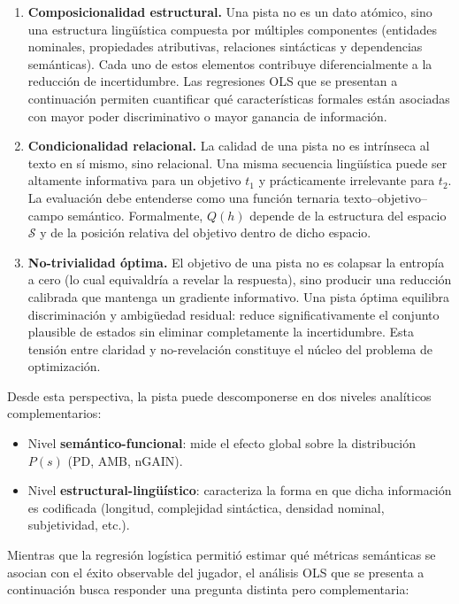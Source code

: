 \documentclass[../main.tex]{subfiles}
\begin{document}
\begin{enumerate}

\item \textbf{Composicionalidad estructural.}
Una pista no es un dato atómico, sino una estructura lingüística compuesta por múltiples componentes (entidades nominales, propiedades atributivas, relaciones sintácticas y dependencias semánticas). Cada uno de estos elementos contribuye diferencialmente a la reducción de incertidumbre. Las regresiones OLS que se presentan a continuación permiten cuantificar qué características formales están asociadas con mayor poder discriminativo o mayor ganancia de información.

\item \textbf{Condicionalidad relacional.}
La calidad de una pista no es intrínseca al texto en sí mismo, sino relacional. Una misma secuencia lingüística puede ser altamente informativa para un objetivo $t_1$ y prácticamente irrelevante para $t_2$. La evaluación debe entenderse como una función ternaria texto–objetivo–campo semántico. Formalmente, $Q(h)$ depende de la estructura del espacio $\mathcal{S}$ y de la posición relativa del objetivo dentro de dicho espacio.

\item \textbf{No-trivialidad óptima.}
El objetivo de una pista no es colapsar la entropía a cero (lo cual equivaldría a revelar la respuesta), sino producir una reducción calibrada que mantenga un gradiente informativo. Una pista óptima equilibra discriminación y ambigüedad residual: reduce significativamente el conjunto plausible de estados sin eliminar completamente la incertidumbre. Esta tensión entre claridad y no-revelación constituye el núcleo del problema de optimización.

\end{enumerate}

Desde esta perspectiva, la pista puede descomponerse en dos niveles analíticos complementarios:

\begin{itemize}
\item Nivel \textbf{semántico-funcional}: mide el efecto global sobre la distribución $P(s)$ (PD, AMB, nGAIN).
\item Nivel \textbf{estructural-lingüístico}: caracteriza la forma en que dicha información es codificada (longitud, complejidad sintáctica, densidad nominal, subjetividad, etc.).
\end{itemize}

Mientras que la regresión logística permitió estimar qué métricas semánticas se asocian con el éxito observable del jugador, el análisis OLS que se presenta a continuación busca responder una pregunta distinta pero complementaria:
\end{document}
